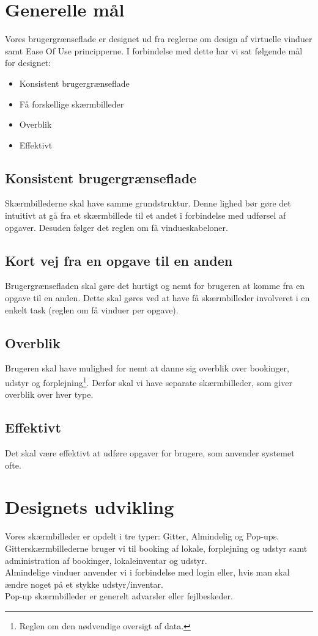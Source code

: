 \clearpage
\section{Generelle mål}
\label{Design_G_Goals}
Vores brugergrænseflade er designet ud fra reglerne om design af virtuelle vinduer\cite[s. 169]{SL_UID} samt Ease Of Use principperne\cite[s. 9]{SL_UID}. I forbindelse med dette har vi sat følgende mål for designet:
\begin{itemize}
\item Konsistent brugergrænseflade
\item Få forskellige skærmbilleder
\item Overblik
\item Effektivt
\end{itemize}

\subsection{Konsistent brugergrænseflade}
Skærmbillederne skal have samme grundstruktur. Denne lighed bør gøre det intuitivt at gå fra et skærmbillede til et andet i forbindelse med udførsel af opgaver. Desuden følger det reglen om få vindueskabeloner.

\subsection{Kort vej fra en opgave til en anden}
Brugergrænsefladen skal gøre det hurtigt og nemt for brugeren at komme fra en opgave til en anden. Dette skal gøres ved at have få skærmbilleder involveret i en enkelt task (reglen om få vinduer per opgave).

\subsection{Overblik}
Brugeren skal have mulighed for nemt at danne sig overblik over bookinger, udstyr og forplejning\footnote{Reglen om den nødvendige oversigt af data.}. Derfor skal vi have separate skærmbilleder, som giver overblik over hver type.

\subsection{Effektivt}
Det skal være effektivt at udføre opgaver for brugere, som anvender systemet ofte.

\clearpage
\section{Designets udvikling}
\label{Design_G_du}
Vores skærmbilleder er opdelt i tre typer: Gitter, Almindelig og Pop-ups.
\\Gitterskærmbillederne bruger vi til booking af lokale, forplejning og udstyr samt administration af bookinger, lokaleinventar og udstyr.
\\Almindelige vinduer anvender vi i forbindelse med login eller, hvis man skal ændre noget på et stykke udstyr/inventar.
\\Pop-up skærmbilleder er generelt advarsler eller fejlbeskeder.

